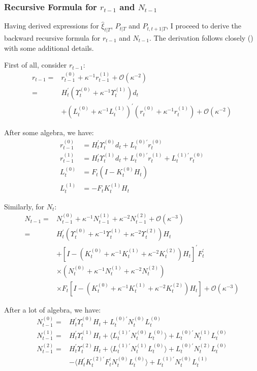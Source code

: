 \documentclass[10pt]{article}
\numberwithin{equation}{section}
\begin{document}
\subsubsection{Recursive Formula for $r_{t-1}$ and $N_{t-1}$} \label{ap:r_N}
Having derived expressions for $\hat{\xi}_{t|T}$, $P_{t|T}$ and $P_{t,t+1|T}$, I proceed to derive the backward recursive formula for $r_{t-1}$ and $N_{t-1}$. The derivation follows closely (\cite{durbin_koopman_2003}) with some additional details. 

First of all, consider $r_{t-1}$:
\begin{align*}
    r_{t-1} =& r_{t-1}^{(0)} + \kappa^{-1}r_{t-1}^{(1)} + \mathcal{O}(\kappa^{-2}) \\
    =& H_t^{'}(\Upsilon_t^{(0)}+ \kappa^{-1}\Upsilon_t^{(1)})d_t \\
    &+ (L_t^{(0)} + \kappa^{-1}L_t^{(1)})^{'}(r_t^{(0)}+\kappa^{-1}r_t^{(1)}) + \mathcal{O}(\kappa^{-2})
\end{align*}

After some algebra, we have:
\begin{align*}
    r_{t-1}^{(0)} &= H_t^{'}\Upsilon_t^{(0)}d_t + L_t^{(0)'}r_t^{(0)} \\
    r_{t-1}^{(1)} &= H_t^{'}\Upsilon_t^{(1)}d_t+L_t^{(0)'}r_t^{(1)} + L_t^{(1)'}r_t^{(0)} \\
    L_t^{(0)} &= F_t(I-K_t^{(0)}H_t) \\
    L_t^{(1)} &= -F_tK_t^{(1)}H_t 
\end{align*}

Similarly, for $N_t$:
\begin{align*}
    N_{t-1} =& N_{t-1}^{(0)} + \kappa^{-1}N_{t-1}^{(1)} + \kappa^{-2}N_{t-1}^{(2)} + \mathcal{O}(\kappa^{-3}) \\
    =& H_t^{'}(\Upsilon_t^{(0)}+\kappa^{-1}\Upsilon_t^{(1)}+\kappa^{-2}\Upsilon_t^{(2)})H_t \\
    &+[I-(K_t^{(0)}+\kappa^{-1}K_t^{(1)}+\kappa^{-2}K_t^{(2)})H_t]^{'}F_t^{'} \\
    &\times(N_t^{(0)}+\kappa^{-1}N_t^{(1)}+\kappa^{-2}N_t^{(2)}) \\
    &\times F_t[I-(K_t^{(0)}+\kappa^{-1}K_t^{(1)}+\kappa^{-2}K_t^{(2)})H_t] + \mathcal{O}(\kappa^{-3})
\end{align*}

After a lot of algebra, we have:
\begin{align*}
    N_{t-1}^{(0)} =& H_t^{'}\Upsilon_t^{(0)}H_t + L_t^{(0)'}N_t^{(0)}L_t^{(0)} \\
    N_{t-1}^{(1)} =& H_t^{'}\Upsilon_t^{(1)}H_t + \langle L_t^{(1)'}N_t^{(0)}L_t^{(0)}\rangle + L_t^{(0)'}N_t^{(1)}L_t^{(0)} \\
    N_{t-1}^{(2)} =& H_t^{'}\Upsilon_t^{(2)}H_t + \langle L_t^{(1)'}N_t^{(1)}L_t^{(0)}\rangle + L_t^{(0)'}N_t^{(2)}L_t^{(0)} \\
    &- \langle H_t^{'}K_t^{(2)'}F_t^{'}N_t^{(0)}L_t^{(0)}\rangle +  L_t^{(1)'}N_t^{(0)}L_t^{(1)}
\end{align*}
\end{document}
